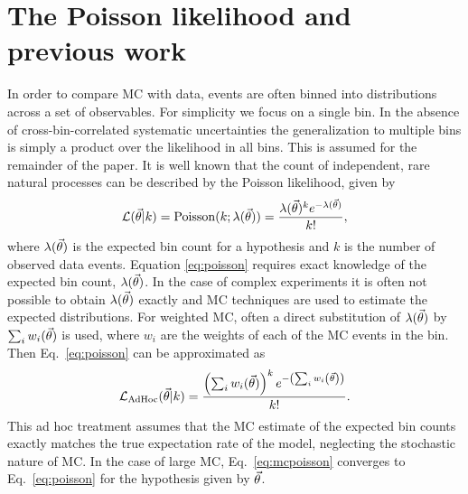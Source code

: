 \section{The Poisson likelihood and previous work\label{sec:mc_intro}}

In order to compare MC with data, events are often binned into distributions across a set of observables. For simplicity we focus on a single bin. In the absence of cross-bin-correlated systematic uncertainties the generalization to multiple bins is simply a product over the likelihood in all bins. This is assumed for the remainder of the paper. It is well known that the count of independent, rare natural processes can be described by the Poisson likelihood, given by
\begin{equation}
\label{eq:poisson}
\mathcal{L}(\vec{\theta}|k) = \mathrm{Poisson}(k;\lambda(\vec{\theta})) = \frac{\lambda(\vec{\theta})^{k}e^{-\lambda(\vec{\theta})}}{k!},
\end{equation}
where $\lambda(\vec{\theta})$ is the expected bin count for a hypothesis and $k$ is the number of observed data events. Equation \eqref{eq:poisson} requires exact knowledge of the expected bin count, $\lambda(\vec{\theta})$. In the case of complex experiments it is often not possible to obtain $\lambda(\vec{\theta})$ exactly and MC techniques are used to estimate the expected distributions. For weighted MC, often a direct substitution of $\lambda(\vec{\theta})$ by $\sum_i{w_i(\vec{\theta})}$ is used, where $w_i$ are the weights of each of the MC events in the bin. Then Eq.~\eqref{eq:poisson} can be approximated as
\begin{equation} \label{eq:mcpoisson}
\mathcal{L}_{\textmd{AdHoc}}(\vec{\theta}|k) = \frac{\left(\sum_{i}{w_i(\vec{\theta})}\right)^{k}e^{-\left(\sum_{i}{w_i\left(\vec{\theta}\right)}\right)}}{k!}.
\end{equation}
This ad hoc treatment assumes that the MC estimate of the expected bin counts exactly matches the true expectation rate of the model, neglecting the stochastic nature of MC. In the case of large MC, Eq.~\eqref{eq:mcpoisson} converges to Eq.~\eqref{eq:poisson} for the hypothesis given by $\vec{\theta}$.

